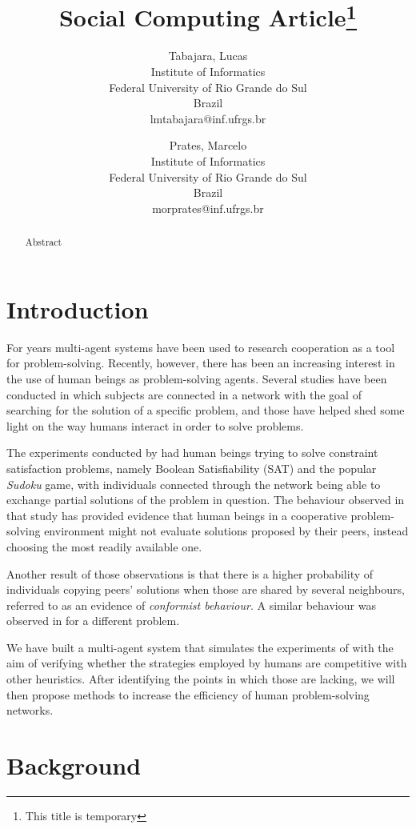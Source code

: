 \documentclass{article}
\title{Social Computing Article\thanks{This title is temporary}}
\author{Tabajara, Lucas \\
Institute of Informatics \\
Federal University of Rio Grande do Sul\\
Brazil \\
lmtabajara@inf.ufrgs.br
\and
Prates, Marcelo \\
Institute of Informatics \\
Federal University of Rio Grande do Sul\\
Brazil \\
morprates@inf.ufrgs.br}
\begin{document}
\maketitle

\begin{abstract}
  Abstract
\end{abstract}

\section{Introduction}

For years multi-agent systems have been used to research cooperation as a tool for problem-solving. Recently, however, there has been an increasing interest in the use of human beings as problem-solving agents. Several studies have been conducted in which subjects are connected in a network with the goal of searching for the solution of a specific problem, and those have helped shed some light on the way humans interact in order to solve problems.

The experiments conducted by \cite{farenzena:collabem} had human beings trying to solve constraint satisfaction problems, namely Boolean Satisfiability (SAT) and the popular \emph{Sudoku} game, with individuals connected through the network being able to exchange partial solutions of the problem in question. The behaviour observed in that study has provided evidence that human beings in a cooperative problem-solving environment might not evaluate solutions proposed by their peers, instead choosing the most readily available one.

Another result of those observations is that there is a higher probability of individuals copying peers' solutions when those are shared by several neighbours, referred to as an evidence of \emph{conformist behaviour}. A similar behaviour was observed in \cite{mason:collablearnet} for a different problem.

We have built a multi-agent system that simulates the experiments of \cite{farenzena:collabem} with the aim of verifying whether the strategies employed by humans are competitive with other heuristics. After identifying the points in which those are lacking, we will then propose methods to increase the efficiency of human problem-solving networks.

\section{Background}
\end{document}
